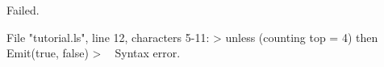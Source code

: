 \runverbatimfalse
{}
\begin{RunVerbatimMsg}
Failed.
\end{RunVerbatimMsg}
\begin{RunVerbatimErr}
File "tutorial.ls", line 12, characters 5-11:
>     unless (counting top = 4) then Emit(true, false)
>     ^^^^^^
Syntax error.
\end{RunVerbatimErr}
